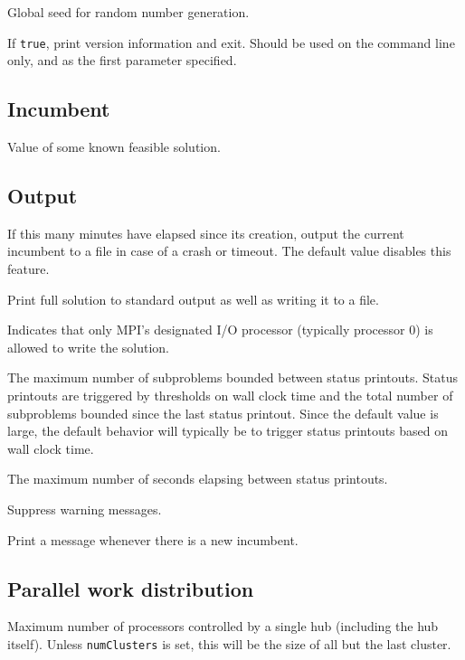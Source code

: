 Global seed for random number generation.

If \texttt{true}, print version information and exit. Should be used  on
the command line only, and as the first parameter specified.


\subsection{Incumbent}
\vspace{-3ex}
Value of some known feasible solution.

\subsection{Output}
\vspace{-3ex}
If this many minutes have elapsed since its creation,
output the current incumbent to a file in case of
a crash or timeout.  The default value disables this
feature.

Print full solution to standard output as well as writing it to a file.

Indicates that only MPI's designated I/O processor (typically processor 0)
is allowed to write the solution.

The maximum number of subproblems bounded between status printouts.
Status printouts are triggered by thresholds on wall clock time and the
total number of subproblems bounded since the last status printout.
Since the default value is large, the default behavior will typically
be to trigger status printouts based on wall clock time.

The maximum number of seconds elapsing between status printouts.

Suppress warning messages.

Print a message whenever there is a new incumbent.

\subsection{Parallel work distribution}
\vspace{-3ex}
Maximum number of processors controlled by a single hub (including the
hub itself).  Unless \texttt{numClusters} is set, this will be the
size of all but the last cluster.

